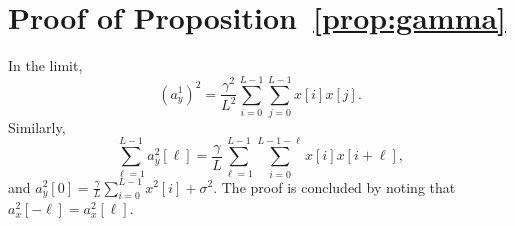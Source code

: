 \documentclass[12pt]{article}
\newcommand{\1}{\mathbf{1}}
\theoremstyle{plain}
\theoremstyle{definition}
\theoremstyle{remark}
\theoremstyle{plain}
\theoremstyle{remark}
\theoremstyle{plain}
\theoremstyle{plain}
\begin{document}
%
%




\appendix

\section{Proof of Proposition~\ref{prop:gamma}} \label{sec:proof_prop_gamma}

In the limit, 
\begin{equation*}
(a^1_y)^2=\frac{\gamma^2}{L^2}\sum_{i=0}^{L-1}\sum_{j=0}^{L-1}x[i]x[j].
\end{equation*}
Similarly,  
\begin{equation*}
\sum_{\ell = 1}^{L-1}a_y^2[\ell]=\frac{\gamma}{L}\sum_{\ell = 1}^{L-1}\sum_{i=0}^{L-1-\ell}x[i]x[i+\ell],
\end{equation*}
and $a_y^2[0]=\frac{\gamma}{L}\sum_{i=0}^{L-1}x^2[i] + \sigma^2$. The proof is concluded by noting that  $a_x^2[-\ell]=a_x^2[\ell]$. 
\end{document}
